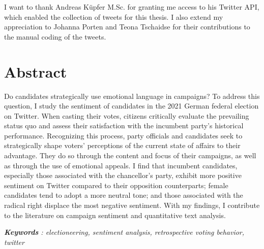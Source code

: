 \documentclass[a4paper,11pt]{article}
\begin{document}
I want to thank Andreas Küpfer M.Sc. for granting me access to his Twitter API,
which enabled the collection of tweets for this thesis. I also extend my
appreciation to Johanna Porten and Teona Tschaidse for their contributions to the manual coding of the tweets.
\pagestyle{plain}
\setcounter{page}{1}    %

\newpage
\hypertarget{abstract}{%
\section*{Abstract}\label{abstract}}

Do candidates strategically use emotional language in campaigns? To address this question, I study the sentiment of candidates in the 2021 German federal election on Twitter. When casting their votes, citizens critically evaluate the prevailing status quo and assess their satisfaction with the incumbent party's historical performance. Recognizing this process, party officials and candidates seek to strategically shape voters' perceptions of the current state of affairs to their advantage. They do so through the content and focus of their campaigns, as well as through the use of emotional appeals. I find that incumbent candidates, especially those associated with the chancellor's party, exhibit more positive sentiment on Twitter compared to their opposition counterparts; female candidates tend to adopt a more neutral tone; and those associated with the radical right displace the most negative sentiment. With my findings, I contribute to the literature on campaign sentiment and quantitative text analysis.
\begin{center}
\textit{\textbf{Keywords} : electioneering, sentiment analysis, retrospective voting behavior, twitter} 
\end{center}
\newpage
\newenvironment{tocfont}{\small}{}
\begin{tocfont}
\tableofcontents
\end{tocfont}
\clearpage
\end{document}
